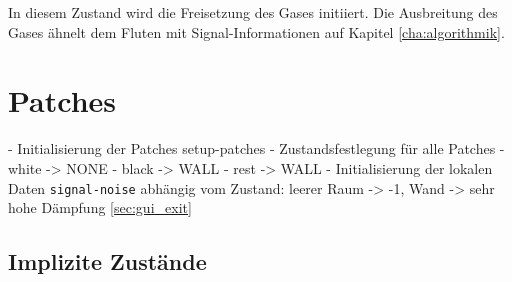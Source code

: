 In diesem Zustand wird die Freisetzung des Gases initiiert. Die Ausbreitung des Gases ähnelt dem Fluten mit Signal-Informationen auf Kapitel \ref{cha:algorithmik}. 

%
%
%
%
%
%


\section{Patches}
\label{sec:patches}

- Initialisierung der Patches setup-patches
 - Zustandsfestlegung für alle Patches 
  - white -> NONE
  - black -> WALL
  - rest -> WALL
 - Initialisierung der lokalen Daten \verb|signal-noise| abhängig vom Zustand: leerer Raum -> -1, Wand -> sehr hohe Dämpfung \ref{sec:gui_exit} 


\subsection{Implizite Zustände}
\label{sec:patch_states}


